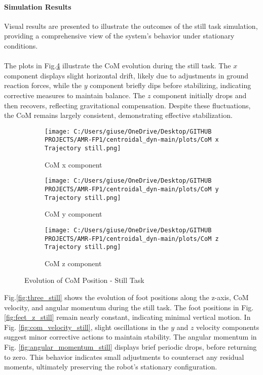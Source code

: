 \documentclass[main.tex]{subfiles}
\begin{document}
\begin{sloppypar}
\paragraph{Simulation Results}
Visual results are presented to illustrate the outcomes of the still task simulation, providing a comprehensive view of the system’s behavior under stationary conditions.\\
\\
The plots in Fig.\ref{fig:com_still} illustrate the CoM evolution during the still task. The \( x \) component displays slight horizontal drift, likely due to adjustments in ground reaction forces, while the \( y \) component briefly dips before stabilizing, indicating corrective measures to maintain balance. The \( z \) component initially drops and then recovers, reflecting gravitational compensation. Despite these fluctuations, the CoM remains largely consistent, demonstrating effective stabilization. \\
\begin{figure}[H]
    \centering
    \begin{subfigure}[b]{0.32\textwidth}
        \centering
        \texttt{[image: C:/Users/giuse/OneDrive/Desktop/GITHUB PROJECTS/AMR-FP1/centroidal\_dyn-main/plots/CoM x Trajectory still.png]}
        \caption{CoM x component}
        \label{fig:com_x_still}
    \end{subfigure}
    \hfill
    \begin{subfigure}[b]{0.32\textwidth}
        \centering
        \texttt{[image: C:/Users/giuse/OneDrive/Desktop/GITHUB PROJECTS/AMR-FP1/centroidal\_dyn-main/plots/CoM y Trajectory still.png]}
        \caption{CoM y component}
        \label{fig:com_y_still}
    \end{subfigure}
    \hfill
    \begin{subfigure}[b]{0.32\textwidth}
        \centering
        \texttt{[image: C:/Users/giuse/OneDrive/Desktop/GITHUB PROJECTS/AMR-FP1/centroidal\_dyn-main/plots/CoM z Trajectory still.png]}
        \caption{CoM z component}
        \label{fig:com_z_still}
    \end{subfigure}
    \caption{Evolution of CoM Position - Still Task}
    \label{fig:com_still}
\end{figure}
Fig.\ref{fig:three_still} shows the evolution of foot positions along the z-axis, CoM velocity, and angular momentum during the still task. The foot positions in Fig. \ref{fig:feet_z_still} remain nearly constant, indicating minimal vertical motion. In Fig. \ref{fig:com_velocity_still}, slight oscillations in the $y$ and $z$ velocity components suggest minor corrective actions to maintain stability. The angular momentum in Fig. \ref{fig:angular_momentum_still} displays brief periodic drops, before returning to zero. This behavior indicates small adjustments to counteract any residual moments, ultimately preserving the robot’s stationary configuration. \\

\end{sloppypar}
\end{document}
